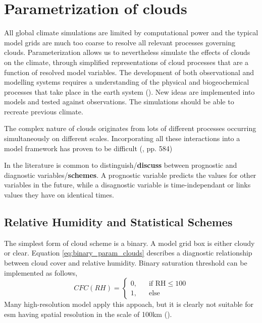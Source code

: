 \section{Parametrization of clouds} \label{sec:param_clouds}
All global climate simulations are limited by computational power and the typical model grids are much too coarse to resolve all relevant processes governing clouds. Parameterization allows us to nevertheless simulate the effects of clouds on the climate, through simplified representations of cloud processes that are a function of resolved model variables. The development of both observational and modelling systems requires a understanding of the physical and biogeochemical processes that take place in the earth system (\cite{Simmons2016Observation2016-2025}). New ideas are implemented into models and tested against observations. The simulations should be able to recreate previous climate. 

The complex nature of clouds originates from lots of different processes occurring simultaneously on different scales. Incorporating all these interactions into a model framework has proven to be difficult (\cite{IPCC_CH7_clouds}, pp. 584)
 

In the literature is common to distinguish/\textbf{discuss} between prognostic and diagnostic variables/\textbf{schemes}. 
A prognostic variable predicts the values for other variables in the future, while a disagnostic variable is time-independant or links values they have on identical times.

\subsection{Relative Humidity and Statistical Schemes}
The simplest form of cloud scheme is a binary. A model grid box is either cloudy or clear. Equation \eqref{eq:binary_param_clouds} describes a diagnostic relationship between cloud cover and relative humidity. Binary saturation threshold can be implemented as follows,
\begin{equation} \label{eq:binary_param_clouds}
    CFC\left(RH\right) = 
     \begin{cases}
       \text{0,} &\quad\text{if RH}\le100\\
       \text{1,} &\quad\text{else}
     \end{cases}
\end{equation}
Many high-resolution model apply this appoach, but it is clearly not suitable for \acrshort{esm} having spatial resolution in the scale of 100km (\cite{Tomkins2005}).

